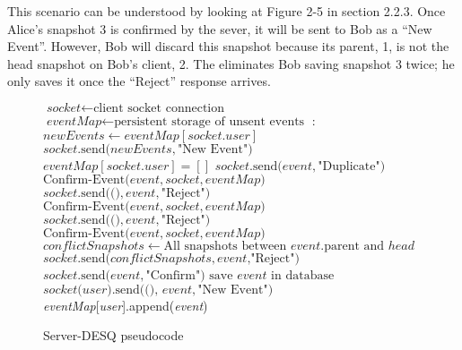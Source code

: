 This scenario can be understood by looking at Figure 2-5 in section 2.2.3. Once Alice's snapshot 3 is confirmed by the sever, it will be sent to Bob as a ``New Event''. However, Bob will discard this snapshot because its parent, 1, is not the head snapshot on Bob's client, 2. The eliminates Bob saving snapshot 3 twice; he only saves it once the ``Reject'' response arrives.

\begin{center}
\begin{figure}[h]
\begin{algorithmic}[1]
\State $\textit{socket} \gets \text{client socket connection}$
\State $\textit{eventMap} \gets \text{persistent storage of unsent events}$
:
\State $newEvents \gets eventMap[socket.user]$
\State $socket\text{.send(}newEvents, \text{"New Event")}$
\State $eventMap[socket.user] = []$
\EndIf
{}
\State $socket\text{.send(}event, \text{"Duplicate")}$
\State $\text{Confirm-Event(}event, socket, eventMap\text{)}$
\Else 
\State $socket\text{.send(()}, event, \text{"Reject")}$
\EndIf
{}
\State $\text{Confirm-Event(}event, socket, eventMap\text{)}$
\Else 
\State $socket\text{.send(()}, event, \text{"Reject")}$
\EndIf
\Else {}
\State $\text{Confirm-Event(}event, socket, eventMap\text{)}$
\Else
\State $conflictSnapshots \gets \text{All snapshots between }event\text{.parent and }head$
\State $socket\text{.send(}conflictSnapshots, event\text{,"Reject")}$
\EndIf
\EndIf
\EndWhile
\EndProcedure
{}
\State $socket\text{.send(}event, \text{"Confirm")}$
\State $\text{save }event\text{ in database}$
\State $socket\text{(}user\text{).send((), }event, \text{"New Event")}$
\Else
\State \emph{eventMap}[\emph{user}].append(\emph{event})
\EndIf
\EndFor
\EndProcedure
\end{algorithmic}
\caption{Server-DESQ pseudocode}\label{euclid}
\end{figure}
\end{center}

